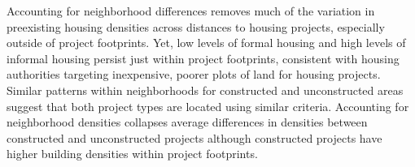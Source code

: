 \documentclass[12pt]{article}
\begin{document}
Accounting for neighborhood differences removes much of the variation in preexisting housing densities across distances to housing projects, especially outside of project footprints.  Yet, low levels of formal housing and high levels of informal housing persist just within project footprints, consistent with housing authorities targeting inexpensive, poorer plots of land for housing projects.  Similar patterns within neighborhoods for constructed and unconstructed areas suggest that both project types are located using similar criteria.  Accounting for neighborhood densities collapses average differences in densities between constructed and unconstructed projects although constructed projects have higher building densities within project footprints.  

\end{document}
